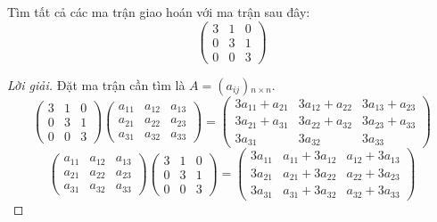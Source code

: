 \documentclass[class=linearalgebra,crop=false]{standalone}
\begin{document}
\begin{exercise}
    Tìm tất cả các ma trận giao hoán với ma trận sau đây:
    \[
        \begin{pmatrix}
            3 & 1 & 0 \\
            0 & 3 & 1 \\
            0 & 0 & 3
        \end{pmatrix}
    \]
\end{exercise}

\begin{proof}[Lời giải]
    Đặt ma trận cần tìm là $A = (a_{ij}){}_{n\times n}$.
    \[
        \begin{pmatrix}
            3 & 1 & 0 \\
            0 & 3 & 1 \\
            0 & 0 & 3
        \end{pmatrix}
        \begin{pmatrix}
            a_{11} & a_{12} & a_{13} \\
            a_{21} & a_{22} & a_{23} \\
            a_{31} & a_{32} & a_{33}
        \end{pmatrix}=
        \begin{pmatrix}
            3a_{11} + a_{21} & 3a_{12} + a_{22} & 3a_{13} + a_{23} \\
            3a_{21} + a_{31} & 3a_{22} + a_{32} & 3a_{23} + a_{33} \\
            3a_{31}          & 3a_{32}          & 3a_{33}
        \end{pmatrix}
    \]
    \[
        \begin{pmatrix}
            a_{11} & a_{12} & a_{13} \\
            a_{21} & a_{22} & a_{23} \\
            a_{31} & a_{32} & a_{33}
        \end{pmatrix}
        \begin{pmatrix}
            3 & 1 & 0 \\
            0 & 3 & 1 \\
            0 & 0 & 3
        \end{pmatrix}=
        \begin{pmatrix}
            3a_{11} & a_{11} + 3a_{12} & a_{12} + 3a_{13} \\
            3a_{21} & a_{21} + 3a_{22} & a_{22} + 3a_{23} \\
            3a_{31} & a_{31} + 3a_{32} & a_{32} + 3a_{33}
        \end{pmatrix}
\]
\end{proof}
\end{document}
